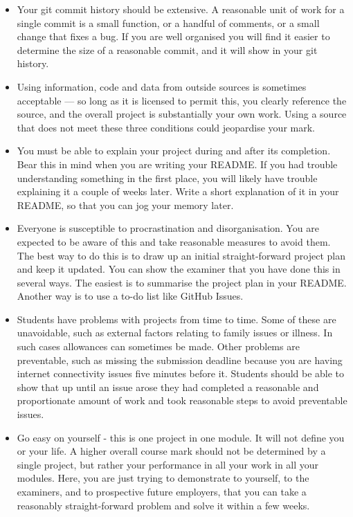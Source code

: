 \documentclass[12pt, a4paper, hidelinks]{scrartcl}
\begin{document}
  \begin{itemize}
    \item
      Your git commit history should be extensive.
      A reasonable unit of work for a single commit is a small function, or a handful of comments, or a small change that fixes a bug.
      If you are well organised you will find it easier to determine the size of a reasonable commit, and it will show in your git history.
    \item
      Using information, code and data from outside sources is sometimes acceptable --- so long as it is licensed to permit this, you clearly reference the source, and the overall project is substantially your own work.
      Using a source that does not meet these three conditions could jeopardise your mark.
    \item
      You must be able to explain your project during and after its completion.
      Bear this in mind when you are writing your README.
      If you had trouble understanding something in the first place, you will likely have trouble explaining it a couple of weeks later.
      Write a short explanation of it in your README, so that you can jog your memory later.
    \item
      Everyone is susceptible to procrastination and disorganisation.
      You are expected to be aware of this and take reasonable measures to avoid them.
      The best way to do this is to draw up an initial straight-forward project plan and keep it updated.
      You can show the examiner that you have done this in several ways.
      The easiest is to summarise the project plan in your README.
      Another way is to use a to-do list like GitHub Issues.
    \item
      Students have problems with projects from time to time.
      Some of these are unavoidable, such as external factors relating to family issues or illness.
      In such cases allowances can sometimes be made.
      Other problems are preventable, such as missing the submission deadline because you are having internet connectivity issues five minutes before it.
      Students should be able to show that up until an issue arose they had completed a reasonable and proportionate amount of work and took reasonable steps to avoid preventable issues.
    \item
      Go easy on yourself - this is one project in one module.
      It will not define you or your life.
      A higher overall course mark should not be determined by a single project, but rather your performance in all your work in all your modules.
      Here, you are just trying to demonstrate to yourself, to the examiners, and to prospective future employers, that you can take a reasonably straight-forward problem and solve it within a few weeks.
  \end{itemize}


  
  
\end{document}
